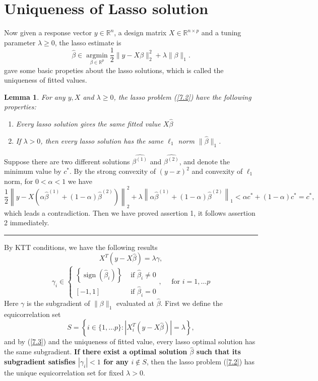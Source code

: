 \documentclass[12pt]{article}
\numberwithin{equation}{section}
\newtheorem{lemma}[theorem]{Lemma}
\newenvironment{proof}{{\bf Proof:}}{\hfill\rule{2mm}{2mm}}
\begin{document}
\section{Uniqueness of Lasso solution}\label{Uniqueness of Lasso solution}
Now given a response vector $y\in \mathbb{R}^n$, a design matrix $X \in \mathbb{R}^{n\times p}$ and a tuning parameter $\lambda\geq 0$, the lasso estimate is
\begin{equation}\label{7.2}
\hat{\beta} \in \underset{\beta \in \mathbb{R}^{p}}{\operatorname{argmin}} \frac{1}{2}\|y-X \beta\|_{2}^{2}+\lambda\|\beta\|_{1}.
\end{equation}
\citet*{tibshirani2013lasso} gave some basic propeties about the lasso solutions, which is called the uniqueness of fitted values.
\begin{lemma}\label{lemma 7.1}
	For any $y, X$ and $\lambda\geq 0$, the lasso problem (\ref{7.2}) have the following properties:
	\begin{enumerate}
		\item Every lasso solution gives the same fitted value $X\hat{\beta}$
		\item If $\lambda >0$, then every lasso solution has the same $\ell_1$ norm $\|\hat{\beta}\|_1$.
	\end{enumerate}
\end{lemma}
\begin{proof}
	Suppose there are two different solutions $\hat{\beta^{(1)}}$ and $\hat{\beta^{(2)}}$, and denote the minimum value by $c^{*}$. By the strong convexity of $(y-x)^2$ and convexity of $\ell_1$ norm, for $0<\alpha<1$ we have
	$$
	\frac{1}{2}\left\|y-X\left(\alpha \hat{\beta}^{(1)}+(1-\alpha) \hat{\beta}^{(2)}\right)\right\|_{2}^{2}+\lambda\left\|\alpha \hat{\beta}^{(1)}+(1-\alpha) \hat{\beta}^{(2)}\right\|_{1}<\alpha c^{*}+(1-\alpha) c^{*}=c^{*},
	$$
	which leads a contradiction. Then we have proved assertion 1, it follows assertion 2 immediately.
\end{proof}

By KTT conditions, we have the following results
\begin{equation}\label{7.3}
X^{T}(y-X \hat{\beta})=\lambda \gamma,
\end{equation}
$$
\gamma_{i} \in\left\{\begin{array}{ll}{\left\{\operatorname{sign}\left(\hat{\beta}_{i}\right)\right\}} & {\text { if } \hat{\beta}_{i} \neq 0} \\ {[-1,1]} & {\text { if } \hat{\beta}_{i}=0}\end{array}, \quad \text { for } i=1, \ldots p\right.
$$
Here $\gamma$ is the subgradient of $\|\beta\|_1$ evaluated at $\hat\beta$.  First we define the equicorrelation set 
$$S = \left\{i \in\{1, \ldots p\}:\left|X_{i}^{T}(y-X \hat{\beta})\right|=\lambda\right\},$$
and by (\ref{7.3}) and the uniqueness of fitted value, every lasso optimal solution has the same subgradient. \textbf{If there exist a optimal solution $\hat{\beta}$ such that its subgradient satisfies $|\gamma_{i}|<1$ for any $i\notin S$}, then the lasso problem (\ref{7.2}) has the unique equicorrelation set for fixed $\lambda>0$.
\end{document}
